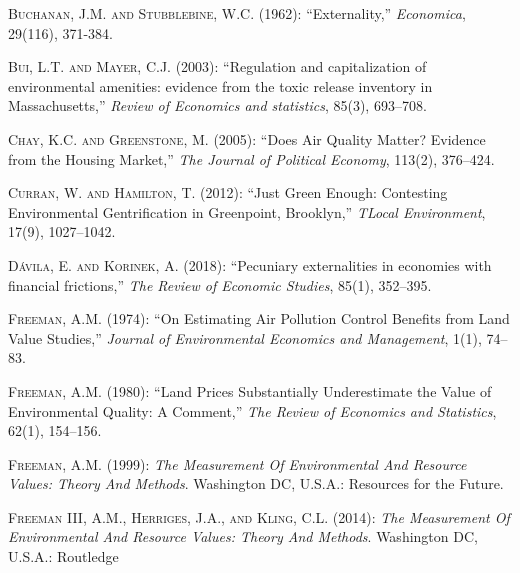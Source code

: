 \documentclass[ecta,nameyear,draft]{econsocart}
\theoremstyle{plain}
\theoremstyle{remark}
\begin{document}
\begin{thebibliography}{}
\textsc{Buchanan, J.M. and Stubblebine, W.C.} (1962):
``Externality,''
\textit{Economica}, 29(116), 371-384.
\endbibitem

\textsc{Bui, L.T. and Mayer, C.J.} (2003):
``Regulation and capitalization of environmental amenities: evidence from the toxic release inventory in Massachusetts,''
\textit{Review of Economics and statistics}, 85(3), 693--708.
\endbibitem


\textsc{Chay, K.C. and Greenstone, M.} (2005):
``Does Air Quality Matter? Evidence from the Housing Market,''
\textit{The Journal of Political Economy}, 113(2), 376--424.
\endbibitem

 
\textsc{Curran, W. and Hamilton, T.} (2012):
``Just Green Enough: Contesting Environmental Gentrification in Greenpoint, Brooklyn,''
\textit{TLocal Environment}, 17(9), 1027--1042.
\endbibitem

 
\textsc{Dávila, E. and Korinek, A.} (2018):
``Pecuniary externalities in economies with financial frictions,''
\textit{The Review of Economic Studies}, 85(1), 352--395.
\endbibitem

\textsc{Freeman, A.M.} (1974):
``On Estimating Air Pollution Control Benefits from Land Value Studies,''
\textit{Journal of Environmental Economics and Management}, 1(1), 74--83.
\endbibitem

\textsc{Freeman, A.M.} (1980):
``Land Prices Substantially Underestimate the Value of Environmental Quality: A Comment,''
\textit{The Review of Economics and Statistics}, 62(1), 154--156.
\endbibitem


\textsc{Freeman, A.M.} (1999):
\textit{The Measurement Of Environmental And Resource Values: Theory And Methods}.
Washington DC, U.S.A.: Resources for the Future.
\endbibitem
 
\textsc{Freeman III, A.M., Herriges, J.A., and Kling, C.L.} (2014):
\textit{The Measurement Of Environmental And Resource Values: Theory And Methods}.
Washington DC, U.S.A.: Routledge
\endbibitem 


\end{thebibliography}
\end{document}
